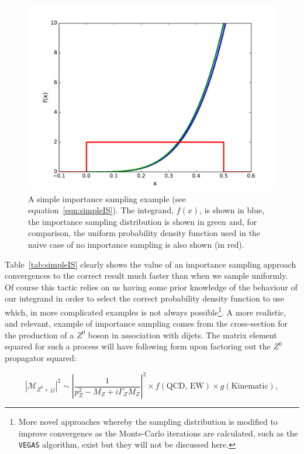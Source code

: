 	\begin{figure}[htp]
		\includegraphics[width=\textwidth]{importanceSampling}
		\caption{A simple importance sampling example (see equation~\ref{eqn:simpleIS}).  The integrand, $f(x)$, is shown in blue,
		the importance sampling distribution is shown in green and, for comparison, the uniform probability density function used
		in the naive case of no importance sampling is also shown (in red).}
		\label{fig:simpleIS}
  	\end{figure}

  	Table~\ref{tab:simpleIS} clearly shows the value of an importance sampling approach convergences to the correct result
  	much faster than when we sample uniformly. Of course this tactic relies on us having some prior knowledge of the behaviour of our
  	integrand in order to select the correct probability density function to use which, in more complicated examples is not always
  	possible\footnote{More novel approaches whereby the sampling distribution is modified to improve convergence as the Monte-Carlo
  	iterations are calculated, such as the \texttt{VEGAS} algorithm,
  	exist but they will not be discussed here.}. A more realistic, and relevant, example of importance sampling comes from the
  	cross-section for the production of a $Z^0$ boson in association with dijets.  The matrix element squared for such a process
  	will have following form upon factoring out the $Z^0$ propagator squared:

  	\begin{equation}
  		|\mathcal{M}_{Z^0+jj}|^2 \sim \left|\frac{1}{p_Z^2 - M_Z + i\Gamma_ZM_Z}\right|^2\times f(\text{QCD, EW})\times g(\text{Kinematic}),
  		\label{eqn:schematicZ}
  	\end{equation}


